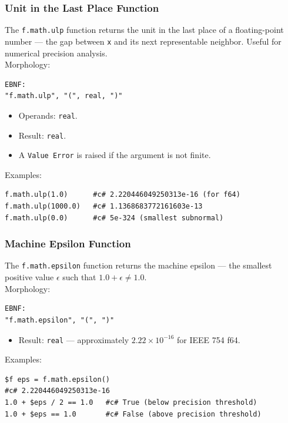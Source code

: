 \subsubsection{Unit in the Last Place Function}
The \texttt{f.math.ulp} function returns the unit in the last place of a floating-point number --- the gap between \texttt{x} and its next representable neighbor. Useful for numerical precision analysis. \\
Morphology:
\begin{verbatim}
EBNF:
"f.math.ulp", "(", real, ")"
\end{verbatim}
\begin{itemize}
\item Operands: \texttt{real}.
\item Result: \texttt{real}.
\item A \texttt{Value Error} is raised if the argument is not finite.
\end{itemize}
Examples:
\begin{verbatim}
f.math.ulp(1.0)      #c# 2.220446049250313e-16 (for f64)
f.math.ulp(1000.0)   #c# 1.1368683772161603e-13
f.math.ulp(0.0)      #c# 5e-324 (smallest subnormal)
\end{verbatim}

\subsubsection{Machine Epsilon Function}
The \texttt{f.math.epsilon} function returns the machine epsilon --- the smallest positive value $\epsilon$ such that $1.0 + \epsilon \neq 1.0$. \\
Morphology:
\begin{verbatim}
EBNF:
"f.math.epsilon", "(", ")"
\end{verbatim}
\begin{itemize}
\item Result: \texttt{real} --- approximately $2.22 \times 10^{-16}$ for IEEE 754 f64.
\end{itemize}
Examples:
\begin{verbatim}
$f eps = f.math.epsilon()
#c# 2.220446049250313e-16
1.0 + $eps / 2 == 1.0   #c# True (below precision threshold)
1.0 + $eps == 1.0       #c# False (above precision threshold)
\end{verbatim}

